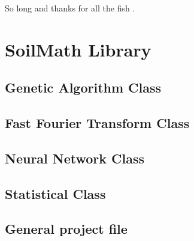 \documentclass[fleqn,10pt]{SelfArx} %
\begin{document}
So long and thanks for all the fish \cite{Figueredo:2009dg}.





\newpage
\onecolumn
\appendix
\section{SoilMath Library}
\subsection{Genetic Algorithm Class}

\newpage

\newpage
\subsection{Fast Fourier Transform Class}

\newpage

\newpage
\subsection{Neural Network Class}

\newpage

\newpage
\subsection{Statistical Class}

\newpage

\newpage
\subsection{General project file}

\newpage

\newpage

\newpage

\newpage

\newpage

\newpage

\end{document}
